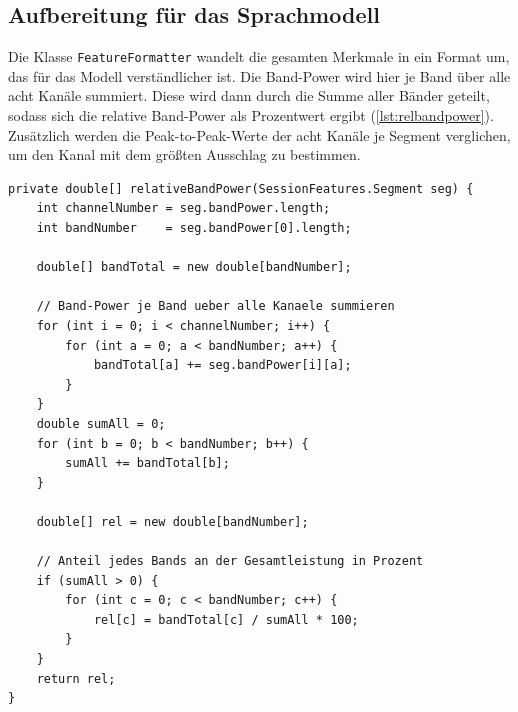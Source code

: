 \subsection{Aufbereitung für das Sprachmodell} Die Klasse \texttt{FeatureFormatter} wandelt die gesamten Merkmale in ein Format um, das für das Modell verständlicher ist. Die Band-Power wird hier je Band über alle acht Kanäle summiert. Diese wird dann durch die Summe aller Bänder geteilt, sodass sich die relative Band-Power als Prozentwert ergibt (\autoref{lst:relbandpower}). Zusätzlich werden die Peak-to-Peak-Werte der acht Kanäle je Segment verglichen, um den Kanal mit dem größten Ausschlag zu bestimmen.
\begin{lstlisting}[style=code, caption={[Relative Band-Power]Umrechnung der absoluten Band-Power in relative Anteile. Die Werte werden über alle Kanäle summiert und als Prozentanteil ausgegeben.}, label={lst:relbandpower}]
private double[] relativeBandPower(SessionFeatures.Segment seg) {
    int channelNumber = seg.bandPower.length;
    int bandNumber    = seg.bandPower[0].length;

    double[] bandTotal = new double[bandNumber];

    // Band-Power je Band ueber alle Kanaele summieren
    for (int i = 0; i < channelNumber; i++) {
        for (int a = 0; a < bandNumber; a++) {
            bandTotal[a] += seg.bandPower[i][a];
        }
    }
    double sumAll = 0;
    for (int b = 0; b < bandNumber; b++) {
        sumAll += bandTotal[b];
    }

    double[] rel = new double[bandNumber];

    // Anteil jedes Bands an der Gesamtleistung in Prozent
    if (sumAll > 0) {
        for (int c = 0; c < bandNumber; c++) {
            rel[c] = bandTotal[c] / sumAll * 100;
        }
    }
    return rel;
}
\end{lstlisting}

